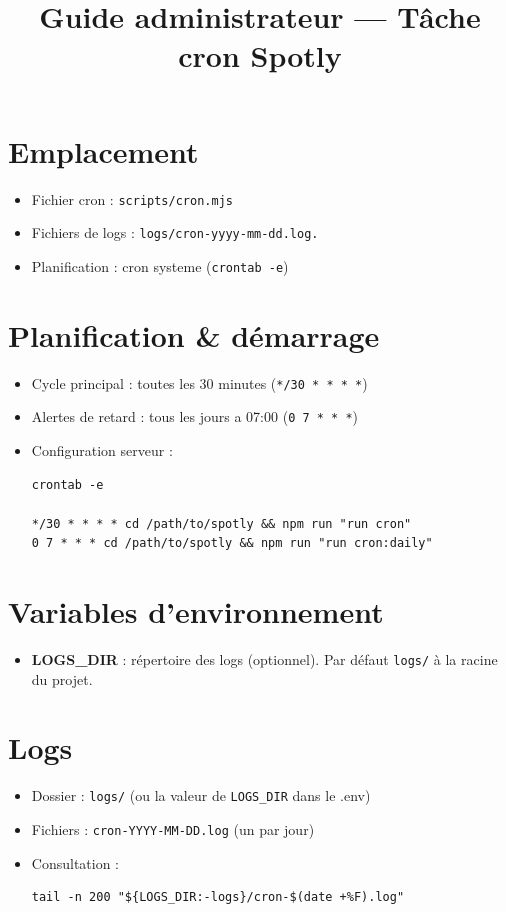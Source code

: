\documentclass{article}
\title{Guide administrateur — Tâche cron Spotly}
\date{}
\begin{document}
\maketitle

\section*{Emplacement}
\begin{itemize}[leftmargin=1.2em]
  \item Fichier cron : \texttt{scripts/cron.mjs}
  \item Fichiers de logs : \texttt{logs/cron-yyyy-mm-dd.log.}
  \item Planification : cron systeme (\texttt{crontab -e})
\end{itemize}

\section*{Planification \& démarrage}
\begin{itemize}[leftmargin=1.2em]
  \item Cycle principal : toutes les 30 minutes (\texttt{*/30 * * * *})
  \item Alertes de retard : tous les jours a 07:00 (\texttt{0 7 * * *})
  \item Configuration serveur :
\begin{verbatim}
crontab -e

*/30 * * * * cd /path/to/spotly && npm run "run cron"
0 7 * * * cd /path/to/spotly && npm run "run cron:daily"
\end{verbatim}
\end{itemize}

\section*{Variables d'environnement}
\begin{itemize}[leftmargin=1.2em]
  \item \textbf{LOGS\_DIR} : répertoire des logs (optionnel). Par défaut \texttt{logs/} à la racine du projet.
\end{itemize}

\section*{Logs}
\begin{itemize}[leftmargin=1.2em]
  \item Dossier : \texttt{logs/} (ou la valeur de \texttt{LOGS\_DIR} dans le .env)
  \item Fichiers : \texttt{cron-YYYY-MM-DD.log} (un par jour)
  \item Consultation :
\begin{verbatim}
tail -n 200 "${LOGS_DIR:-logs}/cron-$(date +%F).log"
\end{verbatim}
\end{itemize}
\end{document}
